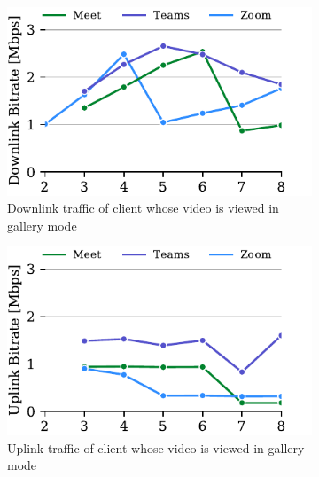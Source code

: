 \begin{figure}[ht]
\begin{subfigure}[t]{.33\textwidth}
  \centering
   \captionsetup{width=.9\linewidth}
    \includegraphics[width=1\textwidth,keepaspectratio]{../figures/modality/speaker_recv.pdf}
    \caption{Downlink traffic of client whose video is viewed in gallery mode}
    \label{fig:gallery-recv}
\end{subfigure}
\hfill
\begin{subfigure}[t]{.33\textwidth}
  \centering
   \captionsetup{width=.9\linewidth}
    \includegraphics[width=1\textwidth,keepaspectratio]{../figures/modality/gallery_send.pdf}
    \caption{Uplink traffic of client whose video is viewed in gallery mode}
    \label{fig:gallery-send}
\end{subfigure}
\hfill
\begin{subfigure}[t]{.33\textwidth}
  \centering
   \captionsetup{width=.9\linewidth}

\end{subfigure}
\end{figure}
